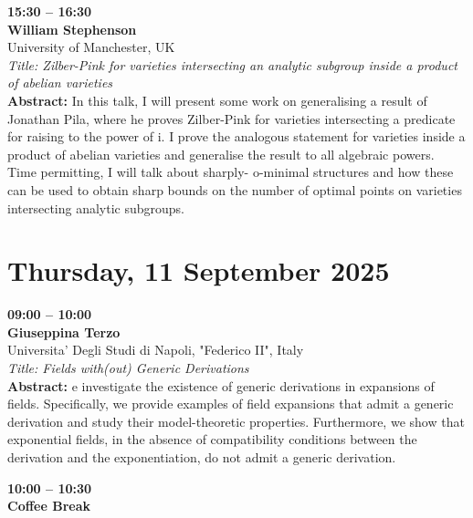 \documentclass[10pt,a4paper]{article}
\begin{document}
\begin{tcolorbox}[talkbox]
\textbf{15:30 -- 16:30} \\
\textbf{William Stephenson} \\
University of Manchester, UK \\
\textit{Title: Zilber-Pink for varieties intersecting an analytic subgroup inside a product of abelian varieties} \\
\textbf{Abstract:} In this talk, I will present some work on generalising a result of Jonathan Pila, where he proves Zilber-Pink for varieties intersecting a predicate for raising to the power of i. I prove the analogous statement for varieties inside a product of abelian varieties and generalise the result to all algebraic powers. Time permitting, I will talk about sharply- o-minimal structures and how these can be used to obtain sharp bounds on the number of optimal points on varieties intersecting analytic subgroups.
\end{tcolorbox}

\newpage

\section{Thursday, 11 September 2025}

\begin{tcolorbox}[talkbox]
\textbf{09:00 -- 10:00} \\
\textbf{Giuseppina Terzo} \\
Universita' Degli Studi di Napoli, "Federico II", Italy \\
\textit{Title: Fields with(out) Generic Derivations} \\
\textbf{Abstract:} e investigate the existence of generic derivations in expansions of fields. Specifically, we provide examples of field expansions that admit a generic derivation and study their model-theoretic properties. Furthermore, we show that exponential fields, in the absence of compatibility conditions between the derivation and the exponentiation, do not admit a generic derivation.
\end{tcolorbox}

\begin{tcolorbox}[talkbox]
\textbf{10:00 -- 10:30} \\
\textbf{Coffee Break}
\end{tcolorbox}
\end{document}

